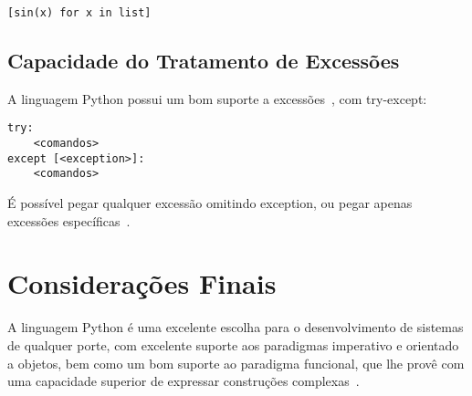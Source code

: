 \documentclass[12pt]{article}
\begin{document}
\begin{lstlisting}
[sin(x) for x in list]
\end{lstlisting}

\subsection{Capacidade do Tratamento de Excessões}\label{sec:excessoes}

A linguagem Python possui um bom suporte a excessões~\cite{Rossum:1995:PRM:869369}, com \textsf{try-except}:

\begin{lstlisting}
try:
    <comandos>
except [<exception>]:
    <comandos>
\end{lstlisting}

É possível pegar qualquer excessão omitindo \textsf{exception}, ou pegar apenas
excessões específicas~\cite{Rossum:1995:PRM:869369}.

\section{Considerações Finais}

A linguagem Python é uma excelente escolha para o desenvolvimento de sistemas de
qualquer porte, com excelente suporte aos paradigmas imperativo e orientado a
objetos, bem como um bom suporte ao paradigma funcional, que lhe provê com uma
capacidade superior de expressar construções complexas~\cite{Rossum:1995:PRM:869369}.


\printbibliography
\end{document}
